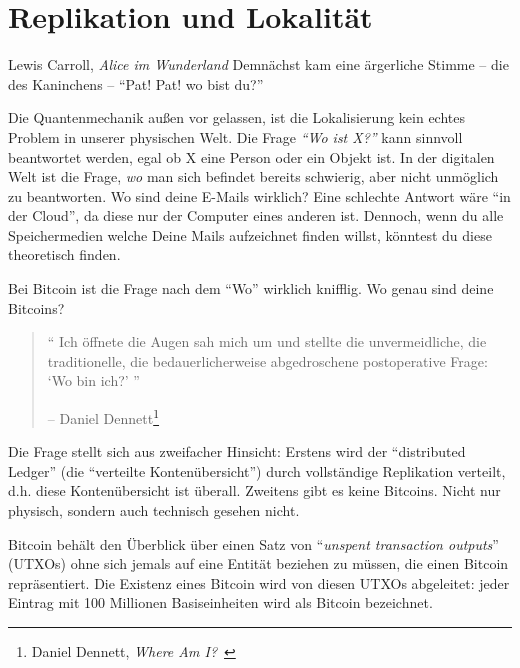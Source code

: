 \chapter{Replikation und Lokalität}
\label{les:3}

\begin{chapquote}{Lewis Carroll, \textit{Alice im Wunderland}}
Demnächst kam eine ärgerliche Stimme -- die des Kaninchens -- \enquote{Pat! Pat! wo bist du?}
\end{chapquote}

Die Quantenmechanik außen vor gelassen, ist die Lokalisierung kein echtes
Problem in unserer physischen Welt. Die Frage \textit{\enquote{Wo ist X?}} kann
sinnvoll beantwortet werden, egal ob X eine Person oder ein Objekt ist. In der
digitalen Welt ist die Frage, \textit{wo} man sich befindet bereits schwierig,
aber nicht unmöglich zu beantworten. Wo sind deine E-Mails wirklich? Eine
schlechte Antwort wäre \enquote{in der Cloud}, da diese nur der Computer eines
anderen ist. Dennoch, wenn du alle Speichermedien welche Deine Mails aufzeichnet
finden willst, könntest du diese theoretisch finden.

Bei Bitcoin ist die Frage nach dem \enquote{Wo} wirklich knifflig. Wo genau sind
deine Bitcoins?

\begin{quotation}\begin{samepage}
\enquote{
Ich öffnete die Augen sah mich um und stellte die unvermeidliche, die
traditionelle, die bedauerlicherweise abgedroschene postoperative Frage:
\enquote{Wo bin ich?}
}
\begin{flushright} -- Daniel Dennett\footnote{Daniel Dennett, \textit{Where Am I?}~\cite{where-am-i}}
\end{flushright}\end{samepage}\end{quotation}

Die Frage stellt sich aus zweifacher Hinsicht: Erstens wird der
\enquote{distributed Ledger} (die \enquote{verteilte Kontenübersicht}) durch
vollständige Replikation verteilt, d.h. diese Kontenübersicht ist überall.
Zweitens gibt es keine Bitcoins. Nicht nur physisch, sondern auch technisch
gesehen nicht.

Bitcoin behält den Überblick über einen Satz von \enquote{\textit{unspent
transaction outputs}} (UTXOs) ohne sich jemals auf eine Entität beziehen zu
müssen, die einen Bitcoin repräsentiert. Die Existenz eines Bitcoin wird von
diesen UTXOs abgeleitet: jeder Eintrag mit 100 Millionen Basiseinheiten wird als
Bitcoin bezeichnet.

